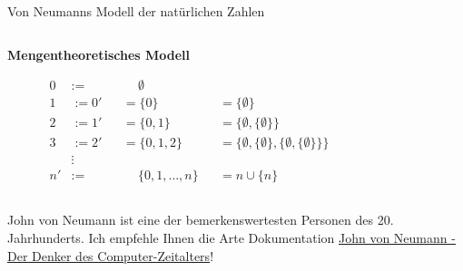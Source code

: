 \documentclass[12pt,ngerman,a4paper,ignorenonframetext,]{beamer}
\begin{document}
\begin{frame}{Von Neumanns Modell der natürlichen Zahlen}
\protect\hypertarget{von-neumanns-modell-der-naturlichen-zahlen}{}

\begin{columns}[T]
\begin{column}{0.74\textwidth}
{\footnotesize{}

\textbf{Mengentheoretisches Modell}

\begin{alignat*}{3}
    0 &:=    &&\quad\ \emptyset&&\\
    1 &:= 0' &&= \{0\}          &&= \{ \emptyset \}\\
    2 &:= 1' &&= \{0, 1\}       &&= \{ \emptyset, \{ \emptyset \} \}\\
    3 &:= 2' &&= \{0, 1, 2\}    &&= \{ \emptyset, \{ \emptyset \}, \{ \emptyset, \{ \emptyset \} \} \}\\
      &\vdots&& &&\\
    n'&:=    &&\quad\ \{0,1,\ldots,n\} &&= n \cup \{n\}
\end{alignat*}

}
\end{column}

\begin{column}{0.24\textwidth}
\end{column}
\end{columns}


\begin{Bemerkung}[]

John von Neumann ist eine der bemerkenswertesten Personen des 20.
Jahrhunderts. Ich empfehle Ihnen die Arte Dokumentation
\href{http://www.sefiroth.net/MfWInf/videos/JohnVonNeumann.mp4}{John von
Neumann - Der Denker des Computer-Zeitalters}!

\end{Bemerkung}

\end{frame}
\end{document}
